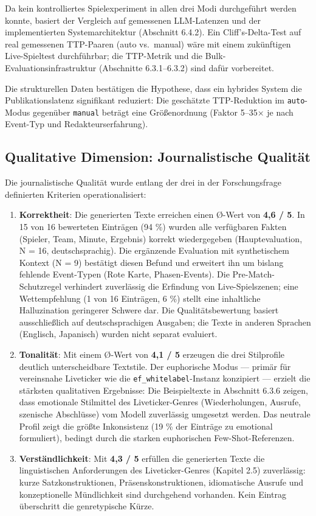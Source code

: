 Da kein kontrolliertes Spielexperiment in allen drei Modi durchgeführt
werden konnte, basiert der Vergleich auf gemessenen LLM-Latenzen und der
implementierten Systemarchitektur (Abschnitt 6.4.2). Ein
Cliff's-Delta-Test auf real gemessenen TTP-Paaren (auto vs.~manual) wäre
mit einem zukünftigen Live-Spieltest durchführbar; die TTP-Metrik und
die Bulk-Evaluationsinfrastruktur (Abschnitte 6.3.1--6.3.2) sind dafür
vorbereitet.

Die strukturellen Daten bestätigen die Hypothese, dass ein hybrides
System die Publikationslatenz signifikant reduziert: Die geschätzte
TTP-Reduktion im \texttt{auto}-Modus gegenüber \texttt{manual} beträgt
eine Größenordnung (Faktor 5--35× je nach Event-Typ und
Redakteurserfahrung).

\subsection{Qualitative Dimension: Journalistische
Qualität}\label{qualitative-dimension-journalistische-qualituxe4t}

Die journalistische Qualität wurde entlang der drei in der
Forschungsfrage definierten Kriterien operationalisiert:

\begin{enumerate}
\def\labelenumi{\arabic{enumi}.}
\item
  \textbf{Korrektheit}: Die generierten Texte erreichen einen Ø-Wert von
  \textbf{4,6 / 5}. In 15 von 16 bewerteten Einträgen (94 \%) wurden
  alle verfügbaren Fakten (Spieler, Team, Minute, Ergebnis) korrekt
  wiedergegeben (Hauptevaluation, N = 16, deutschsprachig). Die
  ergänzende Evaluation mit synthetischem Kontext (N = 9) bestätigt
  diesen Befund und erweitert ihn um bislang fehlende Event-Typen (Rote
  Karte, Phasen-Events). Die Pre-Match-Schutzregel verhindert
  zuverlässig die Erfindung von Live-Spielszenen; eine Wettempfehlung (1
  von 16 Einträgen, 6 \%) stellt eine inhaltliche Halluzination
  geringerer Schwere dar. Die Qualitätsbewertung basiert ausschließlich
  auf deutschsprachigen Ausgaben; die Texte in anderen Sprachen
  (Englisch, Japanisch) wurden nicht separat evaluiert.
\item
  \textbf{Tonalität}: Mit einem Ø-Wert von \textbf{4,1 / 5} erzeugen die
  drei Stilprofile deutlich unterscheidbare Textstile. Der euphorische
  Modus --- primär für vereinsnahe Liveticker wie die
  \texttt{ef\_whitelabel}-Instanz konzipiert --- erzielt die stärksten
  qualitativen Ergebnisse: Die Beispieltexte in Abschnitt 6.3.6 zeigen,
  dass emotionale Stilmittel des Liveticker-Genres (Wiederholungen,
  Ausrufe, szenische Abschlüsse) vom Modell zuverlässig umgesetzt
  werden. Das neutrale Profil zeigt die größte Inkonsistenz (19 \% der
  Einträge zu emotional formuliert), bedingt durch die starken
  euphorischen Few-Shot-Referenzen.
\item
  \textbf{Verständlichkeit}: Mit \textbf{4,3 / 5} erfüllen die
  generierten Texte die linguistischen Anforderungen des
  Liveticker-Genres (Kapitel 2.5) zuverlässig: kurze Satzkonstruktionen,
  Präsenskonstruktionen, idiomatische Ausrufe und konzeptionelle
  Mündlichkeit sind durchgehend vorhanden. Kein Eintrag überschritt die
  genretypische Kürze.
\end{enumerate}

